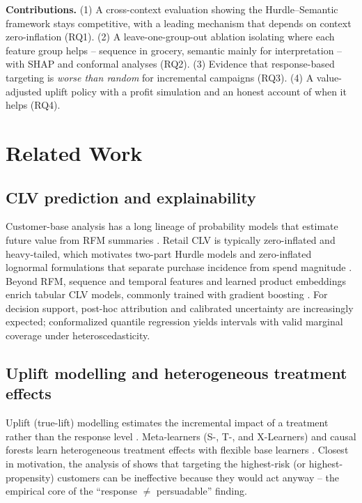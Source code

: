 \documentclass[pdflatex,sn-mathphys-num]{sn-jnl}
\theoremstyle{thmstyleone}
\theoremstyle{thmstylethree}
\begin{document}
\noindent\textbf{Contributions.} (1) A cross-context evaluation showing the Hurdle--Semantic
framework stays competitive, with a leading mechanism that depends on context zero-inflation
(RQ1). (2) A leave-one-group-out ablation isolating where each feature group helps -- sequence in
grocery, semantic mainly for interpretation -- with SHAP and conformal analyses (RQ2). (3) Evidence
that response-based targeting is \emph{worse than random} for incremental campaigns (RQ3). (4) A
value-adjusted uplift policy with a profit simulation and an honest account of when it helps (RQ4).

\section{Related Work}\label{sec:related}
\subsection{CLV prediction and explainability}
Customer-base analysis has a long lineage of probability models that estimate future value from
RFM summaries \citep{fader2005rfm,gupta2006modeling}. Retail CLV is typically zero-inflated
and heavy-tailed, which motivates two-part Hurdle models and zero-inflated lognormal formulations
that separate purchase incidence from spend magnitude \citep{cragg1971hurdle,wang2019deep}. Beyond RFM, sequence and temporal features \citep{bauer2021improved} and learned product
embeddings \citep{chamberlain2017customer} enrich tabular CLV models, commonly trained with
gradient boosting \citep{ke2017lightgbm}. For decision support, post-hoc attribution \citep{lundberg2017unified} and calibrated
uncertainty are increasingly expected; conformalized quantile regression \citep{romano2019cqr}
yields intervals with valid marginal coverage under heteroscedasticity.

\subsection{Uplift modelling and heterogeneous treatment effects}
Uplift (true-lift) modelling estimates the incremental impact of a treatment rather than the
response level \citep{gutierrez2017uplift}. Meta-learners
(S-, T-, and X-Learners) and causal forests learn heterogeneous treatment effects with flexible
base learners \citep{kunzel2019metalearners,wager2018causalforest}.
Closest in motivation, the analysis of \citep{ascarza2018retention} shows that targeting the
highest-risk (or highest-propensity) customers can be ineffective because they would act anyway --
the empirical core of the ``response $\neq$ persuadable'' finding.
\end{document}

